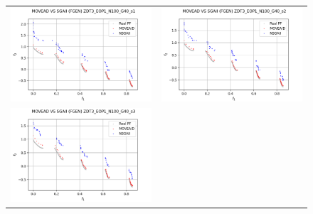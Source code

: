 \begin{figure}[H]
    \centering
    \begin{tabular}{c c}
    \includegraphics[scale=0.5]{figures/ZDT3_EOP1_N100_G40_T15/s1_comp.png} &
    \includegraphics[scale=0.5]{figures/ZDT3_EOP1_N100_G40_T15/s2_comp.png}\\
    \includegraphics[scale=0.5]{figures/ZDT3_EOP1_N100_G40_T15/s3_comp.png} &

\end{tabular}
\end{figure}
